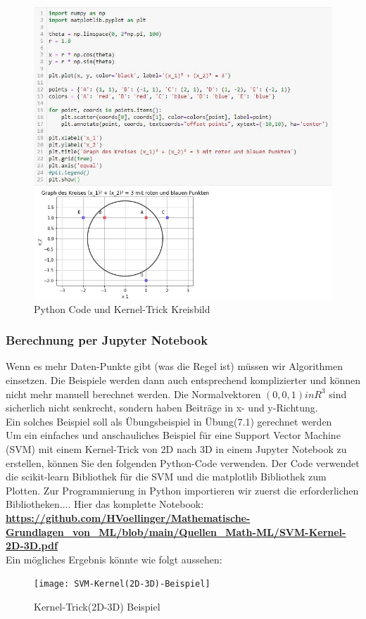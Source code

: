 \documentclass[12pt]{article}
\begin{document}
\begin{figure}[tp]
  \centering
  \hspace*{-0.1cm} 
  \includegraphics[width=1.1\textwidth]{SVM-Kreisbild-Python}
  \caption{Python Code und Kernel-Trick Kreisbild}       
  \label{fig:SVM_Kreis}
\end{figure}
%
\newpage
\subsubsection{Berechnung per Jupyter Notebook}
Wenn es mehr Daten-Punkte gibt (was die Regel ist) müssen wir Algorithmen einsetzen. Die Beispiele werden dann auch entsprechend komplizierter und können nicht mehr manuell berechnet werden. Die Normalvektoren $ (0,0,1)in {R}^3 $ sind sicherlich nicht senkrecht, sondern haben Beiträge in x- und y-Richtung.\\
Ein solches Beispiel soll als Übungsbeispiel in Übung(7.1) gerechnet werden\\[0.3cm]
% 
Um ein einfaches und anschauliches Beispiel für eine Support Vector Machine (SVM) mit einem Kernel-Trick von 2D nach 3D in einem Jupyter Notebook zu erstellen, können Sie den folgenden Python-Code verwenden. Der Code 
verwendet die scikit-learn Bibliothek für die SVM und die matplotlib Bibliothek zum Plotten. Zur Programmierung in Python importieren wir zuerst die erforderlichen Bibliotheken.... Hier das komplette Notebook:\\[0.2cm]
\textbf{\url{https://github.com/HVoellinger/Mathematische-Grundlagen_von_ML/blob/main/Quellen_Math-ML/SVM-Kernel-2D-3D.pdf}}\\
Ein mögliches Ergebnis könnte wie folgt aussehen: \\[5.5cm]
\begin{figure}[htp]
  \centering
  \hspace*{-0.1cm} 
  \texttt{[image: SVM-Kernel(2D-3D)-Beispiel]}
  \caption{Kernel-Trick(2D-3D) Beispiel}    
  \label{fig:SVM_2D-3D}
\end{figure}
%
\newpage
\end{document}
